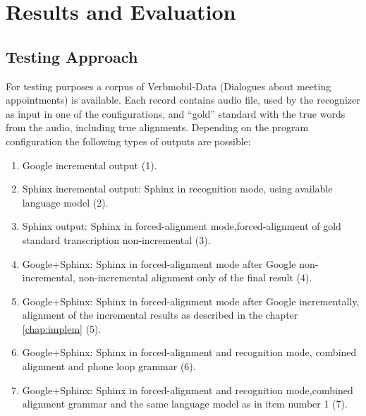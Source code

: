 \chapter{Results and Evaluation}
\label{chap:res}
 \section {Testing Approach} 
For testing purposes  a corpus of  Verbmobil-Data (Dialogues about meeting appointments)  is
available.  Each record contains audio file, used by the recognizer as input in
one of the configurations,  and ``gold'' standard with the true words from the
audio, including true alignments.  Depending on the program configuration 
 the following types of outputs are possible:
\begin {enumerate}
  \item Google incremental output (1).
  \item Sphinx incremental output: Sphinx in recognition mode, using available
  language model (2).
  \item Sphinx output: Sphinx in forced-alignment mode,forced-alignment of gold
  standard transcription non-incremental (3).
  \item Google+Sphinx: Sphinx in forced-alignment mode after Google
  non-incremental, non-incremental alignment only of the final result (4).
  \item Google+Sphinx: Sphinx in forced-alignment mode after Google
  incrementally, alignment of the incremental results as described in the
  chapter \ref {chap:implem} (5).
  \item Google+Sphinx: Sphinx in forced-alignment and recognition mode,
  combined alignment and phone loop grammar (6).
  \item Google+Sphinx: Sphinx in forced-alignment and recognition mode,combined
  alignment grammar and the same language model as in item number 1 (7). 
\end{enumerate}
